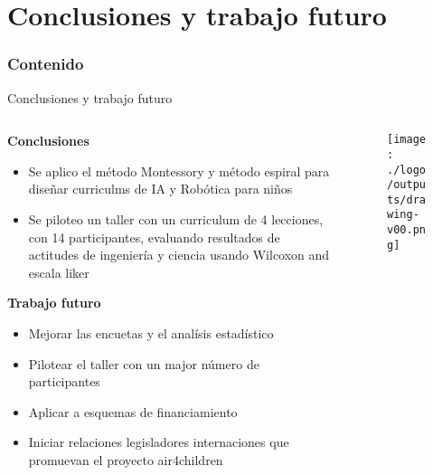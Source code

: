 \section{Conclusiones y trabajo futuro}

\begin{frame}
      \frametitle{Contenido}
      \tableofcontents[currentsection]
\end{frame}

{
\begin{frame}{Conclusiones y trabajo futuro}

  \begin{columns}
  \begin{column}{.75\linewidth}

  \textbf{Conclusiones}   

  \begin{itemize}
    \item Se aplico el m\'etodo Montessory y m\'etodo espiral para dise\~nar curriculms de IA y Rob\'otica para ni\~nos
    \item Se piloteo un taller con un curriculum de 4 lecciones, con 14 participantes, evaluando resultados de actitudes de ingenier\'ia y ciencia usando Wilcoxon and escala liker 
  \end{itemize}

  \textbf{Trabajo futuro}
  \begin{itemize}
    \item Mejorar las encuetas y el anal\'isis estad\'istico 
    \item Pilotear el taller con un major n\'umero de participantes
    \item Aplicar a esquemas de financiamiento
    \item Iniciar relaciones legisladores internaciones que promuevan el proyecto air4children
\end{itemize}

    \end{column}


  \begin{column}{.3\linewidth}

      \begin{figure}
        \centering
        \texttt{[image: ./logo/outputs/drawing-v00.png]}
      \end{figure}

    \end{column}
  \end{columns}

\end{frame}
}


%
%
%
